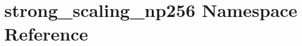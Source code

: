 \hypertarget{namespacestrong__scaling__np256}{}\section{strong\+\_\+scaling\+\_\+np256 Namespace Reference}
\label{namespacestrong__scaling__np256}
